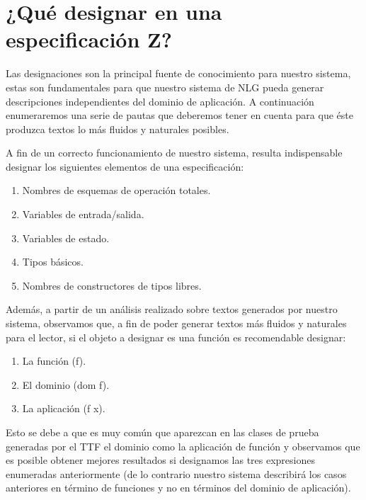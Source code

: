 \chapter{¿Qué designar en una especificación Z?}
\label{ape:designaciones}

Las designaciones son la principal fuente de conocimiento para nuestro sistema, estas son fundamentales para que nuestro sistema de NLG pueda generar descripciones independientes del dominio de aplicación. A continuación enumeraremos una serie de pautas que deberemos tener en cuenta para que éste produzca textos lo más fluidos y naturales posibles.

\bigskip
A fin de un correcto funcionamiento de nuestro sistema, resulta indispensable designar los siguientes elementos de una especificación:

\bigskip
\begin{enumerate}
	\item Nombres de esquemas de operación totales.
	\item Variables de entrada/salida.
	\item Variables de estado.
	\item Tipos básicos.
	\item Nombres de constructores de tipos libres.
\end{enumerate}

\bigskip
Además, a partir de un análisis realizado sobre textos generados por nuestro sistema, observamos que, a fin de poder generar textos más fluidos y naturales para el lector, si el objeto a designar es una función es recomendable designar:

\bigskip
\begin{enumerate}
	\item La función (f).
	\item El dominio (dom f).
	\item La aplicación (f x).
\end{enumerate}

\bigskip
Esto se debe a que es muy común que aparezcan en las clases de prueba generadas por el TTF el dominio como la aplicación de función y observamos que es posible obtener mejores resultados si designamos las tres expresiones enumeradas anteriormente (de lo contrario nuestro sistema describirá los casos anteriores en término de funciones y no en términos del dominio de aplicación).
